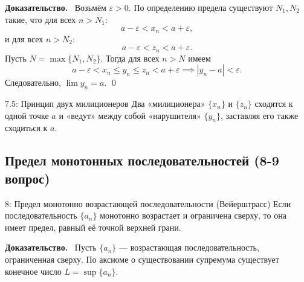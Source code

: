 \documentclass[a4paper,12pt]{article}
\newcommand{\myproof}{\textbf{Доказательство.}\ }
\begin{document}
	\myproof
	Возьмём $\varepsilon > 0$. По определению предела существуют $N_1, N_2$ такие, что для всех $n > N_1$:
	\[
	a - \varepsilon < x_n < a + \varepsilon,
	\]
	и для всех $n > N_2$:
	\[
	a - \varepsilon < z_n < a + \varepsilon.
	\]
	Пусть $N = \max\{N_1, N_2\}$. Тогда для всех $n > N$ имеем
	\[
	a - \varepsilon < x_n \le y_n \le z_n < a + \varepsilon \implies |y_n - a| < \varepsilon.
	\]
	Следовательно, $\lim y_n = a$. \qed
	
	\begin{center}
	\end{center}
	
	\begin{notebook}{7.5: Принцип двух милиционеров}
		Два «милиционера» $\{x_n\}$ и $\{z_n\}$ сходятся к одной точке $a$ и «ведут» между собой «нарушителя» $\{y_n\}$, заставляя его также сходиться к $a$.
	\end{notebook}
	
	
	
	
	
	
	
	
	\newpage
	\subsection{Предел монотонных последовательностей (8-9 вопрос)}
	
	\begin{theorembox}{8: Предел монотонно возрастающей последовательности (Вейерштрасс)}
		Если последовательность $\{a_n\}$ монотонно возрастает и ограничена сверху, то она имеет предел, равный её точной верхней грани.
	\end{theorembox}
	
	\myproof
	Пусть $\{a_n\}$ — возрастающая последовательность, ограниченная сверху. По аксиоме о существовании супремума существует конечное число $L = \sup \{a_n\}$. 
	
\end{document}
